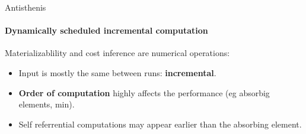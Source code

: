 \begin{frame}{Antisthenis}
  \framesubtitle{Dynamically scheduled incremental computation}

  Materializablility and cost inference are numerical operations:

  \begin{itemize}
  \item Input is mostly the same between runs: \textbf{incremental}.
  \item \textbf{Order of computation} highly affects the performance
    (eg absorbig elements, min).
  \item Self referrential computations may appear earlier than the
    absorbing element.
  \end{itemize}
\end{frame}


